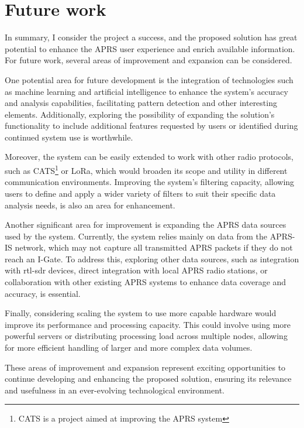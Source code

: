 \section{Future work}

In summary, I consider the project a success, and the proposed solution has great potential to enhance the APRS user experience and enrich available information. For future work, several areas of improvement and expansion can be considered.

One potential area for future development is the integration of technologies such as machine learning and artificial intelligence to enhance the system's accuracy and analysis capabilities, facilitating pattern detection and other interesting elements. Additionally, exploring the possibility of expanding the solution's functionality to include additional features requested by users or identified during continued system use is worthwhile.

Moreover, the system can be easily extended to work with other radio protocols, such as CATS\footnote{CATS is a project aimed at improving the APRS system} or LoRa, which would broaden its scope and utility in different communication environments. Improving the system's filtering capacity, allowing users to define and apply a wider variety of filters to suit their specific data analysis needs, is also an area for enhancement.

Another significant area for improvement is expanding the APRS data sources used by the system. Currently, the system relies mainly on data from the APRS-IS network, which may not capture all transmitted APRS packets if they do not reach an I-Gate. To address this, exploring other data sources, such as integration with rtl-sdr devices, direct integration with local APRS radio stations, or collaboration with other existing APRS systems to enhance data coverage and accuracy, is essential.

Finally, considering scaling the system to use more capable hardware would improve its performance and processing capacity. This could involve using more powerful servers or distributing processing load across multiple nodes, allowing for more efficient handling of larger and more complex data volumes.

These areas of improvement and expansion represent exciting opportunities to continue developing and enhancing the proposed solution, ensuring its relevance and usefulness in an ever-evolving technological environment.


